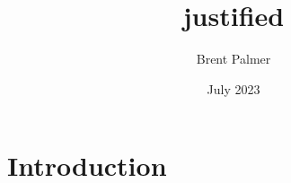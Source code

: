 \documentclass{article}
\title{justified}
\author{Brent Palmer}
\date{July 2023}
\begin{document}
\maketitle

\section{Introduction}

\centering %


\lipsum[1-10]
\end{document}
